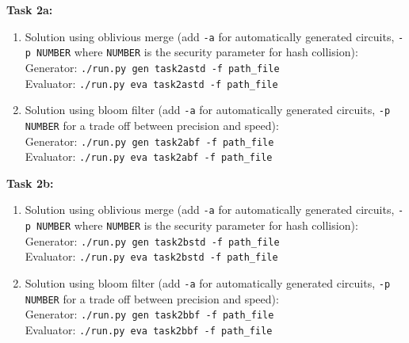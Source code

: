 \documentclass[11pt]{article}
\begin{document}
\noindent\textbf{Task 2a:}\\
\begin{enumerate}
\item Solution using oblivious merge (add {\tt -a} for automatically generated circuits, {\tt -p NUMBER} where {\tt NUMBER} is the security parameter for hash collision):\\
Generator: {\tt ./run.py gen task2astd -f path\_file}\\
Evaluator: {\tt ./run.py eva task2astd -f path\_file}

\item Solution using bloom filter (add {\tt -a} for automatically generated circuits, {\tt -p NUMBER} for a trade off between precision and speed):\\
Generator: {\tt ./run.py gen task2abf -f path\_file}\\
Evaluator: {\tt ./run.py eva task2abf -f path\_file}

\end{enumerate}


\noindent\textbf{Task 2b:}\\
\begin{enumerate}
\item Solution using oblivious merge (add {\tt -a} for automatically generated circuits, {\tt -p NUMBER} where {\tt NUMBER} is the security parameter for hash collision):\\
Generator: {\tt ./run.py gen task2bstd -f path\_file}\\
Evaluator: {\tt ./run.py eva task2bstd -f path\_file}

\item Solution using bloom filter (add {\tt -a} for automatically generated circuits, {\tt -p NUMBER} for a trade off between precision and speed):\\
Generator: {\tt ./run.py gen task2bbf -f path\_file}\\
Evaluator: {\tt ./run.py eva task2bbf -f path\_file}
\end{enumerate}
\begin{comment}



task2a:
---------------------
 -  

 -  

task2b:
---------------------
 -  




 -  
\end{comment}


\end{document}

